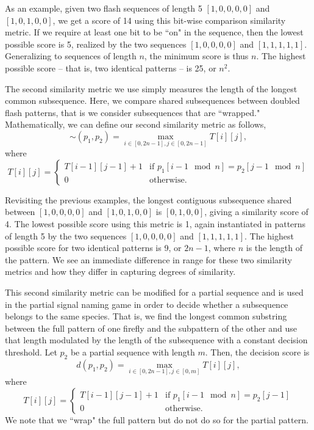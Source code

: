 As an example, given two flash sequences of length 5 $[1,0,0,0,0]$ and $[1,0,1,0,0]$, we get a score of 14 using this bit-wise comparison similarity metric. 
If we require at least one bit to be ``on" in the sequence, then the lowest possible score is 5, realized by the two sequences $[1,0,0,0,0]$ and $[1,1,1,1,1]$. Generalizing to sequences of length $n$, the minimum score is thus $n$. 
The highest possible score -- that is, two identical patterns -- is 25, or $n^2$.

The second similarity metric we use simply measures the length of the longest common subsequence. Here, we compare shared subsequences between doubled flash patterns, that is we consider subsequences that are ``wrapped." 
 Mathematically, we can define our second similarity metric as follows,
\[ \sim (p_1, p_2) =  \max _{i \in [0,2n-1], j \in [0,2n-1]} T[i][j], \] 
where {\tiny \[ T[i][j] = \begin{cases} T[i-1][j-1] + 1 &\textrm{if } p_1[i-1 \mod n] = p_2[j-1 \mod n] \\
	0 &\textrm{otherwise.} \end{cases}\]}
	
Revisiting the previous examples, the longest contiguous subsequence shared between $[1,0,0,0,0]$ and $[1,0,1,0,0]$ is $[0,1,0,0]$, giving a similarity score of 4. 
The lowest possible score using this metric is 1, again instantiated in patterns of length 5 by the two sequences $[1,0,0,0,0]$ and $[1,1,1,1,1]$. 
The highest possible score for two identical patterns is 9, or $2n-1$, where $n$ is the length of the pattern. 
We see an immediate difference in range for these two similarity metrics and how they differ in capturing degrees of similarity. 

This second similarity metric can be modified for a partial sequence and is used in the partial signal naming game in order to decide whether a subsequence belongs to the same species. 
That is, we find the longest common substring between the full pattern of one firefly and the subpattern of the other and use that length modulated by the length of the subsequence with a constant decision threshold. 
Let $p_2$ be a partial sequence with length $m$. Then, the decision score is 
\[ d(p_1, p_2) = \max _{i \in [0,2n-1], j \in [0,m]} T[i][j], \] 
where {\tiny \[ T[i][j] = \begin{cases} T[i-1][j-1] + 1 &\textrm{if } p_1[i-1 \mod n] = p_2[j-1] \\
	0 &\textrm{otherwise.} \end{cases}\]}
We note that we ``wrap" the full pattern but do not do so for the partial pattern. 

